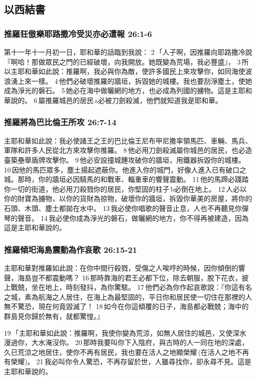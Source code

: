 \subsection{以西結書}
\subsubsection{推羅狂傲樂耶路撒冷受災亦必遭報 26:1-6}
第十一年十一月初一日，耶和華的話臨到我說： 2 「人子啊，因推羅向耶路撒冷說『啊哈！那做眾民之門的已經破壞，向我開放。她既變為荒場，我必豐盛』， 3 所以主耶和華如此說：推羅啊，我必與你為敵，使許多國民上來攻擊你，如同海使波浪湧上來一樣。 4 他們必破壞推羅的牆垣，拆毀她的城樓。我也要刮淨塵土，使她成為淨光的磐石。 5 她必在海中做曬網的地方，也必成為列國的擄物。這是主耶和華說的。 6 屬推羅城邑的居民 a必被刀劍殺滅，他們就知道我是耶和華。

\subsubsection{推羅將為巴比倫王所攻 26:7-14}
主耶和華如此說：我必使諸王之王的巴比倫王尼布甲尼撒率領馬匹、車輛、馬兵、軍隊和許多人民從北方來攻擊你推羅。 8 他必用刀劍殺滅屬你城邑的居民，也必造臺築壘舉盾牌攻擊你。 9 他必安設撞城錘攻破你的牆垣，用鐵器拆毀你的城樓。 10 因他的馬匹眾多，塵土揚起遮蔽你。他進入你的城門，好像人進入已有破口之城。那時，你的牆垣必因騎馬的和戰車、輜重車的響聲震動。 11 他的馬蹄必踐踏你一切的街道，他必用刀殺戮你的居民，你堅固的柱子 b必倒在地上。 12 人必以你的財寶為擄物，以你的貨財為掠物，破壞你的牆垣，拆毀你華美的房屋，將你的石頭、木頭、塵土都拋在水中。 13 我必使你唱歌的聲音止息，人也不再聽見你彈琴的聲音。 14 我必使你成為淨光的磐石，做曬網的地方，你不得再被建造，因為這是主耶和華說的。

\subsubsection{推羅傾圯海島震動為作哀歌 26:15-21}
主耶和華對推羅如此說：在你中間行殺戮，受傷之人唉哼的時候，因你傾倒的響聲，海島豈不都震動嗎？ 16 那時靠海的君王必都下位，除去朝服，脫下花衣，披上戰兢，坐在地上，時刻發抖，為你驚駭。 17 他們必為你作起哀歌說：『你這有名之城，素為航海之人居住，在海上為最堅固的，平日你和居民使一切住在那裡的人無不驚恐，現在何竟毀滅了！ 18 如今在你這傾覆的日子，海島都必戰兢；海中的群島見你歸於無有，就都驚惶。』

19 「主耶和華如此說：推羅啊，我使你變為荒涼，如無人居住的城邑，又使深水漫過你，大水淹沒你。 20 那時我要叫你下入陰府，與古時的人一同在地的深處，久已荒涼之地居住，使你不再有居民，我也要在活人之地顯榮耀 (在活人之地不再有榮耀)。 21 我必叫你令人驚恐，不再存留於世，人雖尋找你，卻永尋不見。這是主耶和華說的。

